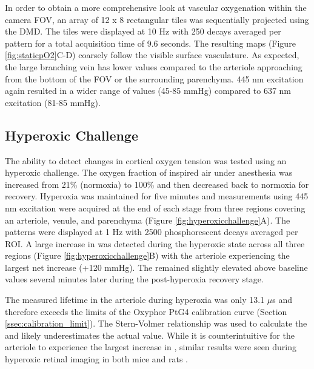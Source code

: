 In order to obtain a more comprehensive look at vascular oxygenation within the camera FOV, an array of 12 x 8 rectangular tiles was sequentially projected using the DMD. The tiles were displayed at 10 Hz with 250 decays averaged per pattern for a total acquisition time of 9.6 seconds. The resulting  maps (Figure \ref{fig:staticpO2}C-D) coarsely follow the visible surface vasculature. As expected, the large branching vein has lower  values compared to the arteriole approaching from the bottom of the FOV or the surrounding parenchyma. 445 nm excitation again resulted in a wider range of  values (45-85 mmHg) compared to 637 nm excitation (81-85 mmHg).

\subsection{Hyperoxic Challenge}

The ability to detect changes in cortical oxygen tension was tested using an hyperoxic challenge. The oxygen fraction of inspired air under anesthesia was increased from 21\% (normoxia) to 100\% and then decreased back to normoxia for recovery. Hyperoxia was maintained for five minutes and  measurements using 445 nm excitation were acquired at the end of each stage from three regions covering an arteriole, venule, and parenchyma (Figure \ref{fig:hyperoxicchallenge}A). The patterns were displayed at 1 Hz with 2500 phosphorescent decays averaged per ROI. A large increase in  was detected during the hyperoxic state across all three regions (Figure \ref{fig:hyperoxicchallenge}B) with the arteriole experiencing the largest net increase (+120 mmHg). The  remained slightly elevated above baseline values several minutes later during the post-hyperoxia recovery stage.

The measured lifetime in the arteriole during hyperoxia was only 13.1 $\mu$s and therefore exceeds the limits of the Oxyphor PtG4 calibration curve (Section \ref{ssec:calibration_limit}). The Stern-Volmer relationship was used to calculate the  and likely underestimates the actual value. While it is counterintuitive for the arteriole to experience the largest increase in , similar results were seen during hyperoxic retinal imaging in both mice and rats \cite{Shonat:2003ia}.

